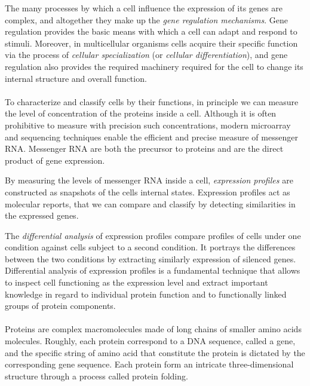 The many processes by which a cell influence the expression of its genes are complex, and altogether they make up the \emph{gene regulation mechanisms}.
Gene regulation provides the basic means with which a cell can adapt and respond to stimuli.
Moreover, in multicellular organisms cells acquire their specific function via the process of \emph{cellular specialization} (or \emph{cellular differentiation}), and gene regulation also provides the required machinery required for the cell to change its internal structure and overall function.

\paragraph{}

To characterize and classify cells by their functions, in principle we can measure the level of concentration of the proteins inside a cell.
Although it is often prohibitive to measure with precision such concentrations, modern microarray and sequencing techniques enable the efficient and precise measure of messenger RNA.
Messenger RNA are both the precursor to proteins and are the direct product of gene expression.

By measuring the levels of messenger RNA inside a cell, \emph{expression profiles} are constructed as snapshots of the cells internal states.
Expression profiles act as molecular reports, that we can compare and classify by detecting similarities in the expressed genes.

The \emph{differential analysis} of expression profiles compare profiles of cells under one condition against cells subject to a second condition.
It portrays the differences between the two conditions by extracting similarly expression of silenced genes.
Differential analysis of expression profiles is a fundamental technique that allows to inspect cell functioning as the expression level and extract important knowledge in regard to individual protein function and to functionally linked groups of protein components.

\paragraph{}

Proteins are complex macromolecules made of long chains of smaller amino acids molecules.
Roughly, each protein correspond to a DNA sequence, called a gene, and the specific string of amino acid that constitute the protein is dictated by the corresponding gene sequence.
Each protein form an intricate three-dimensional structure through a process called protein folding.

